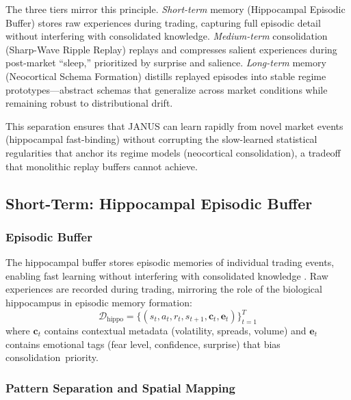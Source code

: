 \documentclass[12pt, a4paper]{article}
\begin{document}
The three tiers mirror this principle. \emph{Short-term} memory (Hippocampal Episodic Buffer) stores raw experiences during trading, capturing full episodic detail without interfering with consolidated knowledge. \emph{Medium-term} consolidation (Sharp-Wave Ripple Replay) replays and compresses salient experiences during post-market ``sleep,'' prioritized by surprise and salience. \emph{Long-term} memory (Neocortical Schema Formation) distills replayed episodes into stable regime prototypes---abstract schemas that generalize across market conditions while remaining robust to distributional drift.

This separation ensures that JANUS can learn rapidly from novel market events (hippocampal fast-binding) without corrupting the slow-learned statistical regularities that anchor its regime models (neocortical consolidation), a tradeoff that monolithic replay buffers cannot achieve.

\subsection{Short-Term: Hippocampal Episodic Buffer}
\label{sec:hippocampus}

\subsubsection{Episodic Buffer}

The hippocampal buffer stores episodic memories of individual trading events, enabling fast learning without interfering with consolidated knowledge \citep{mcclelland1995complementary}. Raw experiences are recorded during trading, mirroring the role of the biological hippocampus in episodic memory formation:
\begin{equation}
	\mathcal{D}_{\text{hippo}} = \{(s_t, a_t, r_t, s_{t+1}, \mathbf{c}_t, \mathbf{e}_t)\}_{t=1}^{T} %
\end{equation}
where $\mathbf{c}_t$ contains contextual metadata (volatility, spreads, volume) and $\mathbf{e}_t$ contains emotional tags (fear level, confidence, surprise) that bias consolidation~priority.

\subsubsection{Pattern Separation and Spatial Mapping}
\end{document}

